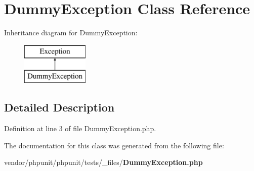 \section{Dummy\+Exception Class Reference}
\label{class_dummy_exception}
Inheritance diagram for Dummy\+Exception\+:\begin{figure}[H]
\begin{center}
\leavevmode
\includegraphics[height=2.000000cm]{class_dummy_exception}
\end{center}
\end{figure}


\subsection{Detailed Description}


Definition at line 3 of file Dummy\+Exception.\+php.



The documentation for this class was generated from the following file\+:\begin{DoxyCompactItemize}
\item 
vendor/phpunit/phpunit/tests/\+\_\+files/{\bf Dummy\+Exception.\+php}\end{DoxyCompactItemize}
